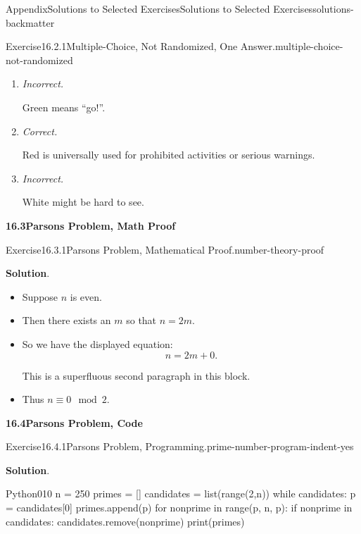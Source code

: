 \documentclass[twoside,10pt,]{article}
\newcommand{\blocktitlefont}{\relax}
\newcommand{\lititle}[1]{{\slshape#1}}
\numberwithin{equation}{section}
\begin{document}
\begin{solutions-section}{Appendix}{Solutions to Selected Exercises}{}{Solutions to Selected Exercises}{}{}{solutions-backmatter}
\begin{divisionsolution}{Exercise}{16.2.1}{Multiple-Choice, Not Randomized, One Answer.}{multiple-choice-not-randomized}
\begin{enumerate}[label={\Alph*.}]
\item{}\lititle{Incorrect.}\par%
Green means ``go!''.%
\item{}\lititle{Correct.}\par%
Red is universally used for prohibited activities or serious warnings.%
\item{}\lititle{Incorrect.}\par%
White might be hard to see.%
\end{enumerate}
%
\end{divisionsolution}%
\par\medskip
\noindent\textbf{\large{}16.3\space\textperiodcentered\space{}Parsons Problem, Math Proof}
\begin{divisionsolution}{Exercise}{16.3.1}{Parsons Problem, Mathematical Proof.}{number-theory-proof}%
\par\smallskip%
\noindent\textbf{\blocktitlefont Solution}.\hypertarget{number-theory-proof-4-back}{}\quad{}%
\begin{itemize}[label=\textbullet]
\item{}Suppose \(n\) is even.%
\item{}Then there exists an \(m\) so that \(n = 2m\).%
\item{}So we have the displayed equation:%
\begin{equation*}
n = 2m + 0\text{.}
\end{equation*}
%
\par
This is a superfluous second paragraph in this block.%
\item{}Thus \(n\equiv 0\mod 2\).%
\end{itemize}
%
\end{divisionsolution}%
\par\medskip
\noindent\textbf{\large{}16.4\space\textperiodcentered\space{}Parsons Problem, Code}
\begin{divisionsolution}{Exercise}{16.4.1}{Parsons Problem, Programming.}{prime-number-program-indent-yes}%
\par\smallskip%
\noindent\textbf{\blocktitlefont Solution}.\hypertarget{prime-number-program-indent-yes-5-back}{}\quad{}\begin{program}{Python}{0}{1}{0}
n = 250
primes = []
candidates = list(range(2,n))
while candidates:
    p = candidates[0]
    primes.append(p)
    for nonprime in range(p, n, p):
        if nonprime in candidates:
            candidates.remove(nonprime)
print(primes)

\end{program}
\end{divisionsolution}
\end{solutions-section}
\end{document}
